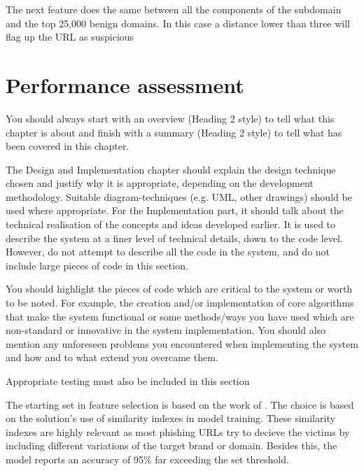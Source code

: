 The next feature does the same between all the components of the subdomain and the top 25,000 benign domains. In this case a distance lower than three will flag up the URL as suspicious

\section{Performance assessment}


\iffalse
	You should always start with an overview (Heading 2 style) to tell what this chapter is about and finish with a summary (Heading 2 style) to tell what has been covered in this chapter.

	The Design and Implementation chapter should explain the design technique chosen and justify why it is appropriate, depending on the development methodology.  Suitable diagram-techniques (e.g. UML, other drawings) should be used where appropriate. For the Implementation part, it should talk about the technical realisation of the concepts and ideas developed earlier. It is used to describe the system at a finer level of technical details, down to the code level. However, do not attempt to describe all the code in the system, and do not include large pieces of code in this section.

	You should highlight the pieces of code which are critical to the system or worth to be noted. For example, the creation and/or implementation of core algorithms that make the system functional or some methods/ways you have used which are non-standard or innovative in the system implementation. You should also mention any unforeseen problems you encountered when implementing the system and how and to what extend you overcame them.

	Appropriate testing must also be included in this section







The starting set in feature selection is based on the work of \cite{SVM_SIMILARITY_INDEX}. The choice is based on the solution's use of similarity indexes in model training. These similarity indexes are highly relevant as most phishing URLs try to decieve the victims by including different variations of the target brand or domain. Besides this, the model reports an accuracy of 95\% far exceeding the set threshold.


